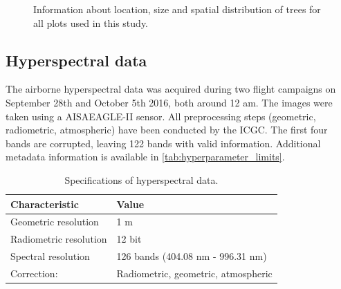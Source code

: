 \documentclass[review]{elsarticle}
\begin{document}
\begin{figure} [t!]
	\begin{center}
		\caption{Information about location, size and spatial distribution of trees for all plots used in this study.}
		\label{fig:study_area}
	\end{center}
\end{figure}


\subsection{Hyperspectral data}

\noindent The airborne hyperspectral data was acquired during two flight campaigns on September 28th and October 5th 2016, both around 12 am.
The images were taken using a AISAEAGLE-II sensor.
All preprocessing steps (geometric, radiometric, atmospheric) have been conducted by the \ac{ICGC}.
The first four bands are corrupted, leaving 122 bands with valid information.
Additional metadata information is available in \autoref{tab:hyperparameter_limits}.

\begin{table}[b!]
\centering
\caption[t]{Specifications of hyperspectral data.}
\begingroup\footnotesize
\begin{tabular}{ll}
	\\
	Characteristic         & Value                               \\
	\hline
	Geometric resolution   & 1 m                                 \\
	Radiometric resolution & 12 bit                              \\
	Spectral resolution    & 126 bands (404.08 nm - 996.31 nm)   \\
	Correction:            & Radiometric, geometric, atmospheric
\end{tabular}
\endgroup
\label{tab:hyperparameter_limits}
\end{table}
\end{document}
